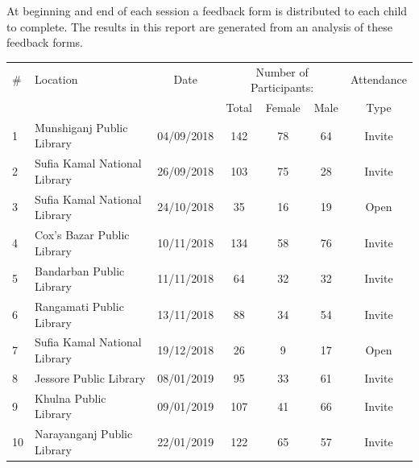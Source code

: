 \documentclass[12pt]{report} %
\begin{document}
At beginning and end of each session a feedback form is distributed to each child to complete. The results in this report are generated from an analysis of these feedback forms.

\begin{table}[ht] 
\centering %
\begin{tabular}{l l c c c c c} %
\hline %
\# & Location & Date & \multicolumn{3}{c}{Number of Participants:} & Attendance\\ %
&&& Total & Female & Male & Type\\ %
\hline
\hline
1 & Munshiganj Public Library & 04/09/2018 & 142 & 78 & 64 & Invite\\ %
2 & Sufia Kamal National Library & 26/09/2018 & 103 & 75 & 28 &Invite\\ %
3 & Sufia Kamal National Library & 24/10/2018 & 35 & 16 & 19 & Open\\ %
4 & Cox's Bazar Public Library & 10/11/2018 & 134 & 58 & 76 & Invite\\ %
5 & Bandarban Public Library & 11/11/2018 & 64 & 32 & 32 & Invite\\ %
6 & Rangamati Public Library & 13/11/2018 & 88 & 34 & 54 & Invite\\ %
7 & Sufia Kamal National Library & 19/12/2018 & 26 & 9 & 17  & Open\\
8 & Jessore Public Library & 08/01/2019 & 95 & 33 & 61 & Invite\\
9 & Khulna Public Library & 09/01/2019 & 107 & 41 & 66 & Invite\\
10 & Narayanganj Public Library & 22/01/2019 & 122 & 65 & 57 & Invite\\

\end{tabular}
\end{table}
\end{document}
